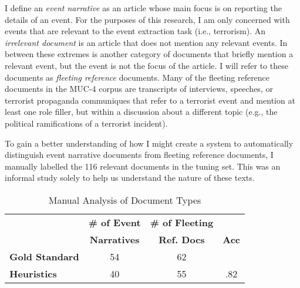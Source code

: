 I define an {\it event narrative} as an article whose main focus is
on reporting the details of an event. 
For the purposes of this research,
I am only concerned with events that are relevant to the event extraction
task (i.e., terrorism). 
An {\it irrelevant document} is an article that does not
mention any relevant events. In between these extremes is another
category of documents that briefly mention a relevant event, but the
event is not the focus of the article. I will refer to these
documents as {\it fleeting reference} documents. Many of the fleeting
reference documents in the MUC-4 corpus are transcripts of interviews,
speeches, or terrorist propaganda communiques that refer to a
terrorist event and mention at least one role filler, but within a
discussion about a different topic (e.g., the political ramifications of a
terrorist  incident).

To gain a better understanding of how I might create a system to
automatically distinguish event narrative documents from fleeting
reference documents, I manually labelled the 116
relevant documents in the tuning set.  This was an informal study
solely to help us understand the nature of these texts.


\begin{table}[ht]
\small
\centering
\begin{tabular}[center]{|lccc|} \hline
{\bf } & {\bf \# of Event} & {\bf \# of Fleeting} & ~ \\ {\bf } & {\bf Narratives} & {\bf  Ref. Docs} & {\bf Acc}  \\ \hline
{\bf Gold Standard} & 54 & 62 & \\
{\bf Heuristics} & 40 & 55 & .82\\ \hline
\end{tabular}
\caption{Manual Analysis of Document Types}
\label{separation-table}
\end{table}


